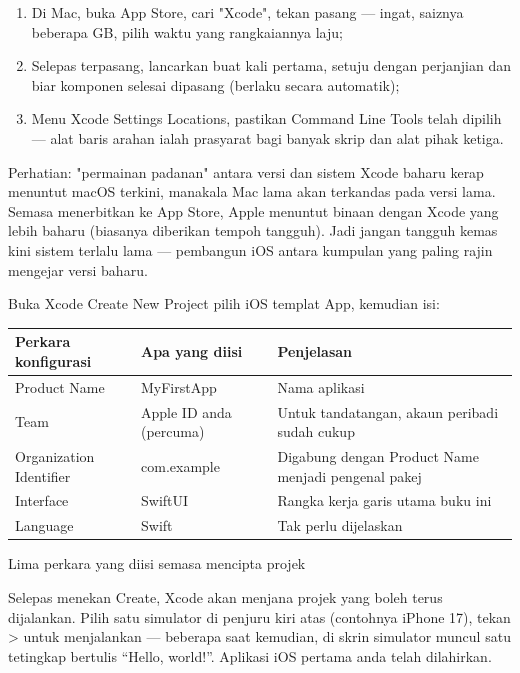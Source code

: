 \begin{enumerate}
  \item Di Mac, buka App Store, cari "Xcode", tekan pasang — ingat, saiznya beberapa GB, pilih waktu yang rangkaiannya laju;
  \item Selepas terpasang, lancarkan buat kali pertama, setuju dengan perjanjian dan biar komponen selesai dipasang (berlaku secara automatik);
  \item Menu Xcode Settings Locations, pastikan Command Line Tools telah dipilih — alat baris arahan ialah prasyarat bagi banyak skrip dan alat pihak ketiga.
\end{enumerate}

\begin{tcbwarn}{Perhatian: "permainan padanan" antara versi dan sistem}
Xcode baharu kerap menuntut macOS terkini, manakala Mac lama akan terkandas pada versi lama. Semasa menerbitkan ke App Store, Apple menuntut binaan dengan Xcode yang lebih baharu (biasanya diberikan tempoh tangguh). Jadi jangan tangguh kemas kini sistem terlalu lama — pembangun iOS antara kumpulan yang paling rajin mengejar versi baharu.

\end{tcbwarn}


Buka Xcode Create New Project pilih iOS templat App, kemudian isi:

\begin{center}
\begin{tabularx}{\linewidth}{|X|X|X|}
\hline
\textbf{Perkara konfigurasi} & \textbf{Apa yang diisi} & \textbf{Penjelasan} \tabularnewline
\hline
Product Name & MyFirstApp & Nama aplikasi \tabularnewline
Team & Apple ID anda (percuma) & Untuk tandatangan, akaun peribadi sudah cukup \tabularnewline
Organization Identifier & com.example & Digabung dengan Product Name menjadi pengenal pakej \tabularnewline
Interface & SwiftUI & Rangka kerja garis utama buku ini \tabularnewline
Language & Swift & Tak perlu dijelaskan \tabularnewline
\hline
\end{tabularx}
\end{center}

\begin{center}\small\color{gray}Lima perkara yang diisi semasa mencipta projek\end{center}

Selepas menekan Create, Xcode akan menjana projek yang boleh terus dijalankan. Pilih satu simulator di penjuru kiri atas (contohnya iPhone 17), tekan > untuk menjalankan — beberapa saat kemudian, di skrin simulator muncul satu tetingkap bertulis “Hello, world!”. Aplikasi iOS pertama anda telah dilahirkan.

